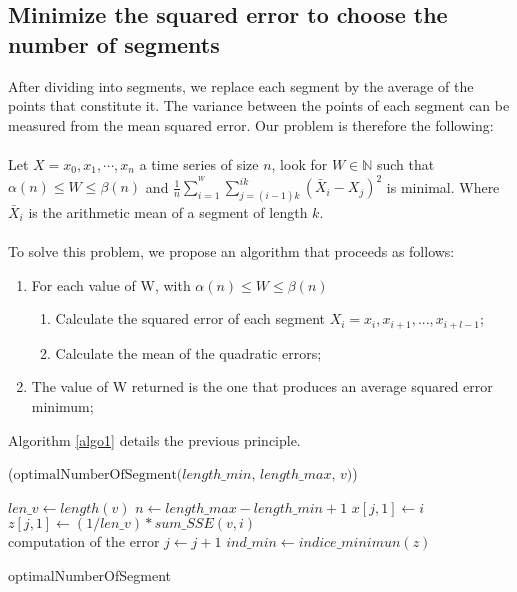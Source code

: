 \subsection{Minimize the squared error to choose the number of segments}
After dividing into segments, we replace each segment by the average of the points that constitute it. The variance between the points of each segment can be measured from the mean squared error. Our problem is therefore the following:
\paragraph{} Let $ X = x_{0}, x_{1}, \cdots, x_{n} $ a time series of size $ n $, look for $ W \in \mathbb{N} $ such that $ \alpha(n) \leq W \leq \beta(n) $ and $ \frac{1}{n} \sum_{i = 1}^{^{W}} \sum_{j = (i-1) k}^{ik} (\bar{X}_{i} - X_{j})^{2} $ is minimal. Where $ \bar{X}_{i} $ is the arithmetic mean of a segment of length $ k $. 




\paragraph{} To solve this problem, we
propose an algorithm that proceeds as follows:
\begin{enumerate}
\item For each value of W, with $ \alpha(n) \leq W \leq \beta(n) $
\begin{enumerate}
\item Calculate the squared error of each segment
$ X_{i} = x_{i}, x_{i + 1}, ..., x_{i + l-1}; $
\item Calculate the mean of the quadratic errors;
\end{enumerate}
\item The value of W returned is the one that produces an average squared error
minimum; 
\end{enumerate}

Algorithm \ref{algo1} details the previous principle.


\begin{algorithm}[h]
\DontPrintSemicolon
{}

\Begin($\text{optimalNumberOfSegment} {(} length\_min, \, length\_max, \, v{)}$)
{
  $len\_v \leftarrow length(v)$\;
  $n \leftarrow length\_max - length\_min + 1$\;
  {
    $x[j, 1] \leftarrow i$\;
    $z[j, 1] \leftarrow  (1/len\_v) * sum\_SSE(v, i)$\; \\computation of the error    
		$j \leftarrow j + 1$\;
  }
	$ind\_min \leftarrow indice\_minimun(z)$\;

}
\caption{optimalNumberOfSegment}
\label{algo1}
\end{algorithm}



